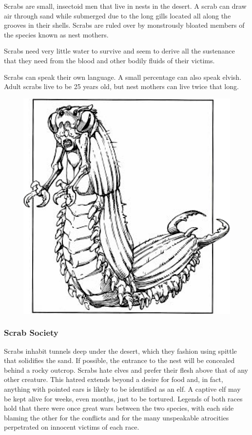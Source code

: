 Scrabs are small, insectoid men that live in nests in the desert. A scrab can draw air through sand while submerged due to the long gills located all along the grooves in their shells. Scrabs are ruled over by monstrously bloated members of the species known as nest mothers.

Scrabs need very little water to survive and seem to derive all the sustenance that they need from the blood and other bodily fluids of their victims.

Scrabs can speak their own language. A small percentage can also speak elvish. Adult scrabs live to be 25 years old, but nest mothers can live twice that long.

\begin{figure}[t!]
\centering
\includegraphics[width=\columnwidth]{images/scrab.png}
\WOTC
\end{figure}

\subsubsection{Scrab Society}
Scrabs inhabit tunnels deep under the desert, which they fashion using spittle that solidifies the sand. If possible, the entrance to the nest will be concealed behind a rocky outcrop. Scrabs hate elves and prefer their flesh above that of any other creature. This hatred extends beyond a desire for food and, in fact, anything with pointed ears is likely to be identified as an elf. A captive elf may be kept alive for weeks, even months, just to be tortured. Legends of both races hold that there were once great wars between the two species, with each side blaming the other for the conflicts and for the many unspeakable atrocities perpetrated on innocent victims of each race.

